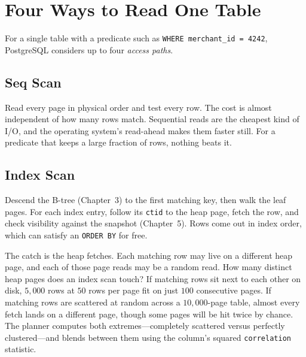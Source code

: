 \section{Four Ways to Read One Table}
\label{ch07:access-paths}

For a single table with a predicate such as \texttt{WHERE merchant\_id = 4242}, PostgreSQL considers up to four \emph{access paths}.

\subsection{Seq Scan}

Read every page in physical order and test every row. The cost is almost independent of how many rows match. Sequential reads are the cheapest kind of I/O, and the operating system's read-ahead makes them faster still. For a predicate that keeps a large fraction of rows, nothing beats it.

\subsection{Index Scan}

Descend the B-tree (Chapter~3) to the first matching key, then walk the leaf pages. For each index entry, follow its \texttt{ctid} to the heap page, fetch the row, and check visibility against the snapshot (Chapter~5). Rows come out in index order, which can satisfy an \texttt{ORDER BY} for free.

The catch is the heap fetches. Each matching row may live on a different heap page, and each of those page reads may be a random read. How many distinct heap pages does an index scan touch? If matching rows sit next to each other on disk, $5{,}000$ rows at $50$ rows per page fit on just $100$ consecutive pages. If matching rows are scattered at random across a $10{,}000$-page table, almost every fetch lands on a different page, though some pages will be hit twice by chance. The planner computes both extremes---completely scattered versus perfectly clustered---and blends between them using the column's squared \texttt{correlation} statistic.


